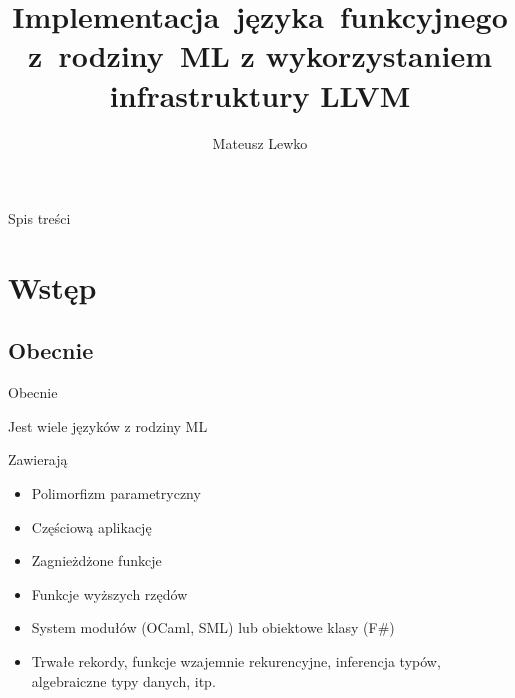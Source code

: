 \documentclass{beamer}
\title[Implementacja~języka~funkcyjnego z~rodziny~ML]
{Implementacja~języka~funkcyjnego \newline z~rodziny~ML \newline
z wykorzystaniem infrastruktury LLVM}
\author{Mateusz Lewko}
\begin{document}
\begin{frame}
  \titlepage
\end{frame}

\begin{frame}{Spis treści}
  \tableofcontents
\end{frame}

\section{Wstęp}

\subsection{Obecnie}
\begin{frame}{Obecnie}
\begin{itemize}
    \item {
        Jest wiele języków z rodziny ML
    \pause
    \item Zawierają
        \begin{itemize}
            \pause
            \item Polimorfizm parametryczny \pause
            \item Częściową aplikację \pause
            \item Zagnieżdżone funkcje \pause
            \item Funkcje wyższych rzędów \pause
            \item System modułów (OCaml, SML) lub obiektowe klasy (F\#) \pause
            \item Trwałe rekordy, funkcje wzajemnie rekurencyjne, 
            inferencja typów, algebraiczne typy danych, itp.
        \end{itemize}
    }
\end{itemize}
\end{frame}

\end{document}
